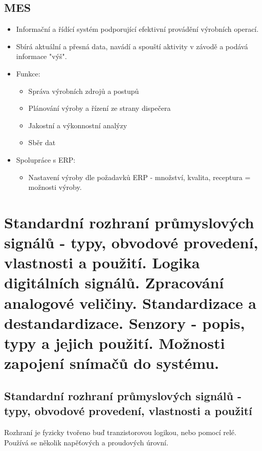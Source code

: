   \subsection{MES}
  \begin{itemize}
    \item Informační a řídící systém podporující efektivní provádění výrobních operací.
    \item Sbírá aktuální a přesná data, navádí a spouští aktivity v závodě a podává informace "výš".
    \item Funkce: \begin{itemize}
        \item Správa výrobních zdrojů a postupů
        \item Plánování výroby a řízení ze strany dispečera
        \item Jakostní a výkonnostní analýzy
        \item Sběr dat
    \end{itemize}
    \item Spolupráce s ERP: \begin{itemize}
        \item Nastavení výroby dle požadavků ERP - množství, kvalita, receptura = možnosti výroby.
    \end{itemize}
  \end{itemize}

\section{Standardní rozhraní průmyslových signálů - typy, obvodové provedení, vlastnosti a použití. Logika digitálních signálů. Zpracování analogové veličiny. Standardizace a destandardizace. Senzory - popis, typy a jejich použití. Možnosti zapojení
snímačů do systému.}

\subsection{Standardní rozhraní průmyslových signálů - typy, obvodové provedení, vlastnosti a použití}
Rozhraní je fyzicky tvořeno buď tranzistorovou logikou, nebo pomocí relé. Používá se několik napěťových a proudových úrovní.
